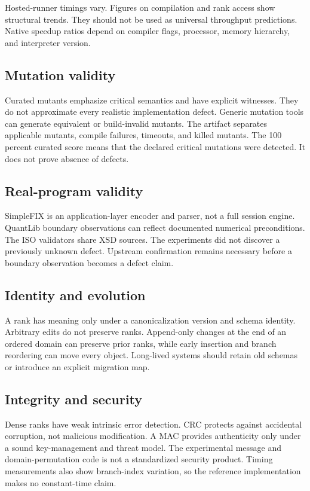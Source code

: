 Hosted-runner timings vary. Figures on compilation and rank access show structural trends. They should not be used as universal throughput predictions. Native speedup ratios depend on compiler flags, processor, memory hierarchy, and interpreter version.

\subsection{Mutation validity}
Curated mutants emphasize critical semantics and have explicit witnesses. They do not approximate every realistic implementation defect. Generic mutation tools can generate equivalent or build-invalid mutants. The artifact separates applicable mutants, compile failures, timeouts, and killed mutants. The 100 percent curated score means that the declared critical mutations were detected. It does not prove absence of defects.

\subsection{Real-program validity}
SimpleFIX is an application-layer encoder and parser, not a full session engine. QuantLib boundary observations can reflect documented numerical preconditions. The ISO validators share XSD sources. The experiments did not discover a previously unknown defect. Upstream confirmation remains necessary before a boundary observation becomes a defect claim.

\subsection{Identity and evolution}
A rank has meaning only under a canonicalization version and schema identity. Arbitrary edits do not preserve ranks. Append-only changes at the end of an ordered domain can preserve prior ranks, while early insertion and branch reordering can move every object. Long-lived systems should retain old schemas or introduce an explicit migration map.

\subsection{Integrity and security}
Dense ranks have weak intrinsic error detection. CRC protects against accidental corruption, not malicious modification. A MAC provides authenticity only under a sound key-management and threat model. The experimental message and domain-permutation code is not a standardized security product. Timing measurements also show branch-index variation, so the reference implementation makes no constant-time claim.


